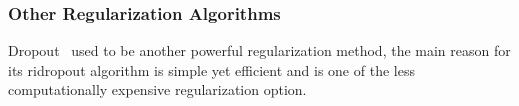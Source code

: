 \subsubsection{Other Regularization Algorithms}

Dropout~\cite{JMLR:v15:srivastava14a} used to be another powerful regularization method, the main reason for its ridropout algorithm is simple yet efficient and is one of the less computationally expensive regularization option. 